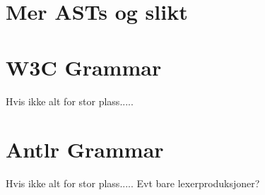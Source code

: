 \appendix
\chapter{Mer ASTs og slikt}
\chapter{W3C Grammar}
Hvis ikke alt for stor plass.....
\chapter{Antlr Grammar}
Hvis ikke alt for stor plass..... Evt bare lexerproduksjoner?
